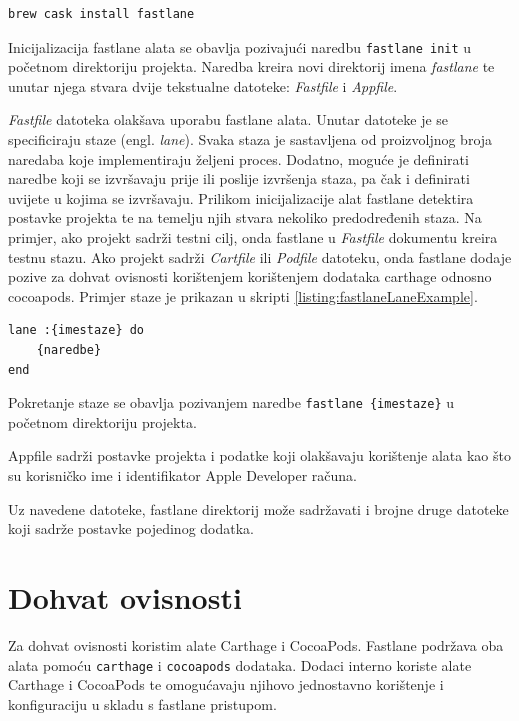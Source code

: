 \documentclass[times, utf8, diplomski, numeric]{fer}
\newcommand{\eng}[1]{(engl. \textit{#1})}
\begin{document}
\begin{appendices}
\begin{lstlisting}[caption=Dohvat i instalacija fastlane alata, label=listing:fastlaneInstall]
brew cask install fastlane
\end{lstlisting}

Inicijalizacija fastlane alata se obavlja pozivajući naredbu \verb|fastlane init| u početnom direktoriju projekta. Naredba kreira novi direktorij imena \textit{fastlane} te unutar njega stvara dvije tekstualne datoteke: \textit{Fastfile} i \textit{Appfile}.

\textit{Fastfile} datoteka olakšava uporabu fastlane alata. Unutar datoteke je se specificiraju staze \eng{lane}. Svaka staza je sastavljena od proizvoljnog broja naredaba koje implementiraju željeni proces. Dodatno, moguće je definirati naredbe koji se izvršavaju prije ili poslije izvršenja staza, pa čak i definirati uvijete u kojima se izvršavaju. Prilikom inicijalizacije alat fastlane detektira postavke projekta te na temelju njih stvara nekoliko predodređenih staza. Na primjer, ako projekt sadrži testni cilj, onda fastlane u \textit{Fastfile} dokumentu kreira testnu stazu. Ako projekt sadrži \textit{Cartfile} ili \textit{Podfile} datoteku, onda fastlane dodaje pozive za dohvat ovisnosti korištenjem korištenjem dodataka carthage odnosno cocoapods. Primjer staze je prikazan u skripti \ref{listing:fastlaneLaneExample}.

\begin{lstlisting}[caption=Primjer fastlane staze, label=listing:fastlaneLaneExample]
lane :{imestaze} do
    {naredbe}
end
\end{lstlisting}

Pokretanje staze se obavlja pozivanjem naredbe \verb|fastlane {imestaze}| u početnom direktoriju projekta.

Appfile sadrži postavke projekta i podatke koji olakšavaju korištenje alata kao što su korisničko ime i identifikator Apple Developer računa.

Uz navedene datoteke, fastlane direktorij može sadržavati i brojne druge datoteke koji sadrže postavke pojedinog dodatka.

\section{Dohvat ovisnosti}

Za dohvat ovisnosti koristim alate Carthage i CocoaPods. Fastlane podržava oba alata pomoću \verb|carthage| i \verb|cocoapods| dodataka. Dodaci interno koriste alate Carthage i CocoaPods te omogućavaju njihovo jednostavno korištenje i konfiguraciju u skladu s fastlane pristupom.


\end{appendices}
\end{document}
